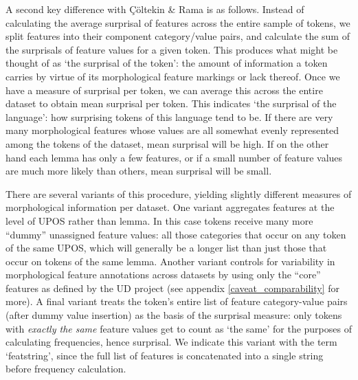 \documentclass[USenglish]{article}
\begin{document}
A second key difference with Çöltekin \& Rama is as follows.
Instead of calculating the average surprisal of features across the entire sample of tokens, we split features into their component category/value pairs, and calculate the sum of the surprisals of feature values for a given token.
This produces what might be thought of as `the surprisal of the token': the amount of information a token carries by virtue of its morphological feature markings or lack thereof.
Once we have a measure of surprisal per token, we can average this across the entire dataset to obtain mean surprisal per token.
This indicates `the surprisal of the language': how surprising tokens of this language tend to be.
If there are very many morphological features whose values are all somewhat evenly represented among the tokens of the dataset, mean surprisal will be high.
If on the other hand each lemma has only a few features, or if a small number of feature values are much more likely than others, mean surprisal will be small.


There are several variants of this procedure, yielding slightly different measures of morphological information per dataset.
One variant aggregates features at the level of UPOS rather than lemma.
In this case tokens receive many more ``dummy'' unassigned feature values: all those categories that occur on any token of the same UPOS, which will generally be a longer list than just those that occur on tokens of the same lemma.
Another variant controls for variability in morphological feature annotations across datasets by using only the ``core'' features as defined by the UD project (see appendix \ref{caveat_comparability} for more).
A final variant treats the token's entire list of feature category-value pairs (after dummy value insertion) as the basis of the surprisal measure: only tokens with \textit{exactly the same} feature values get to count as `the same' for the purposes of calculating frequencies, hence surprisal.
We indicate this variant with the term `featstring', since the full list of features is concatenated into a single string before frequency calculation.
\end{document}
